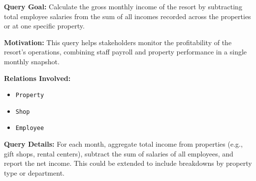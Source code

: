 \documentclass[11pt]{scrartcl}
\begin{document}
\textbf{Query Goal:} Calculate the gross monthly income of the resort by subtracting total employee salaries from the sum of all incomes recorded across the properties or at one specific property.

\textbf{Motivation:} This query helps stakeholders monitor the profitability of the resort’s operations, combining staff payroll and property performance in a single monthly snapshot.

\textbf{Relations Involved:}
\begin{itemize}
  \item \texttt{Property}
  \item \texttt{Shop}
  \item \texttt{Employee}
\end{itemize}

\textbf{Query Details:} For each month, aggregate total income from properties (e.g., gift shops, rental centers), subtract the sum of salaries of all employees, and report the net income. This could be extended to include breakdowns by property type or department.
\end{document}
